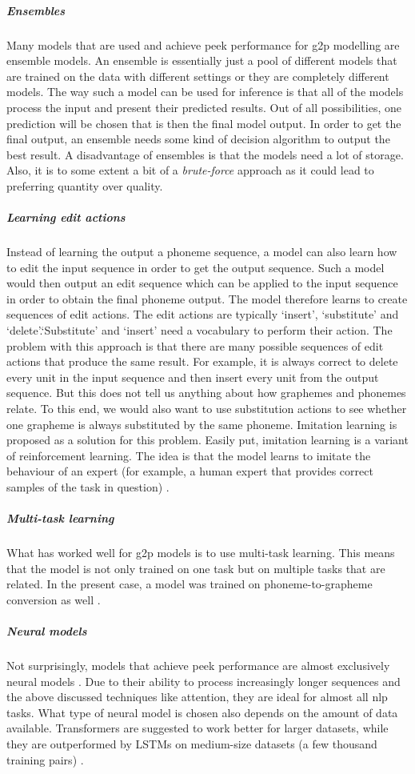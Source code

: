 \subparagraph{Ensembles}
Many models that are used and achieve peek performance for \ac{g2p} modelling are ensemble models. An ensemble is essentially just a pool of different models that are trained on the data with different settings or they are completely different models. The way such a model can be used for inference is that all of the models process the input and present their predicted results. Out of all possibilities, one prediction will be chosen that is then the final model output. In order to get the final output, an ensemble needs some kind of decision algorithm to output the best result. A disadvantage of ensembles is that the models need a lot of storage. Also, it is to some extent a bit of a \textit{brute-force} approach as it could lead to preferring quantity over quality. 

\subparagraph{Learning edit actions}
Instead of learning the output a phoneme sequence, a model can also learn how to edit the input sequence in order to get the output sequence. Such a model would then output an edit sequence which can be applied to the input sequence in order to obtain the final phoneme output. The model therefore learns to create sequences of edit actions. The edit actions are typically `insert', `substitute' and `delete'.`Substitute' and `insert' need a vocabulary to perform their action. The problem with this approach is that there are many possible sequences of edit actions that produce the same result. For example, it is always correct to delete every unit in the input sequence and then insert every unit from the output sequence. But this does not tell us anything about how graphemes and phonemes relate. To this end, we would also want to use substitution actions to see whether one grapheme is always substituted by the same phoneme. Imitation learning is proposed as a solution for this problem. Easily put, imitation learning is a variant of reinforcement learning. The idea is that the model learns to imitate the behaviour of an expert (for example, a human expert that provides correct samples of the task in question) \citep{Ai.2019}. 

\subparagraph{Multi-task learning}
What has worked well for \ac{g2p} models is to use multi-task learning. This means that the model is not only trained on one task but on multiple tasks that are related. In the present case, a model was trained on phoneme-to-grapheme conversion as well \citep{gorman-etal-2020-sigmorphon}.

\subparagraph{Neural models}
Not surprisingly, models that achieve peek performance are almost exclusively neural models \citep{gorman-etal-2020-sigmorphon}. Due to their ability to process increasingly longer sequences and the above discussed techniques like attention, they are ideal for almost all \ac{nlp} tasks. What type of neural model is chosen also depends on the amount of data available. Transformers are suggested to work better for larger datasets, while they are outperformed by LSTMs on medium-size datasets (a few thousand training pairs) \citep{gorman-etal-2020-sigmorphon}.

